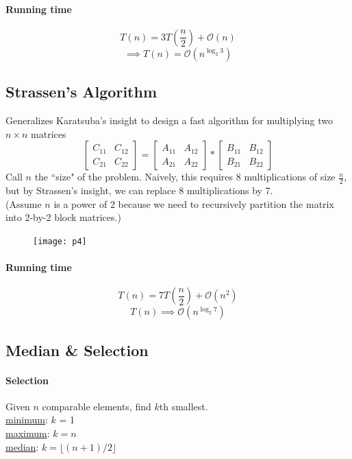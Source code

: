 \documentclass[11pt]{article}
\newcommand{\under}[1]{\underline{#1}}
\begin{document}
\paragraph{Running time}
$$T(n) = 3T(\frac{n}{2}) + \mathcal{O}(n)$$
$$\implies T(n) = \mathcal{O}(n^{\log_2{3}})$$

\subsection{Strassen's Algorithm}
Generalizes Karatsuba's insight to design a fast algorithm for multiplying two $n \times n$ matrices
$$ \begin{bmatrix} C_{11} & C_{12} \\
C_{21} & C_{22}
\end{bmatrix} 
= \begin{bmatrix} A_{11} & A_{12} \\
A_{21} & A_{22}
\end{bmatrix} * \begin{bmatrix} B_{11} & B_{12} \\
B_{21} & B_{22}
\end{bmatrix}$$
Call $n$ the ``size" of the problem. Naively, this requires 8 multiplications of size $\frac{n}{2}$, but by Strassen's insight, we can replace 8 multiplications by 7.\\
(Assume $n$ is a power of 2 because we need to recursively partition the matrix into 2-by-2 block matrices.)
\begin{figure}[h]
	\centering
	\texttt{[image: p4]}
\end{figure}

\paragraph{Running time}
$$T(n) = 7T(\frac{n}{2}) + \mathcal{O}(n^2)$$
$$T(n) \implies \mathcal{O}(n^{\log_2 7})$$


\subsection{Median \& Selection}
\paragraph{Selection}
Given $n$ comparable elements, find $k$th smallest. \\
\under{minimum}: $k$ = 1 \\
\under{maximum}: $k=n$ \\
\under{median}: $k = \lfloor (n+1) / 2\rfloor$
\end{document}
